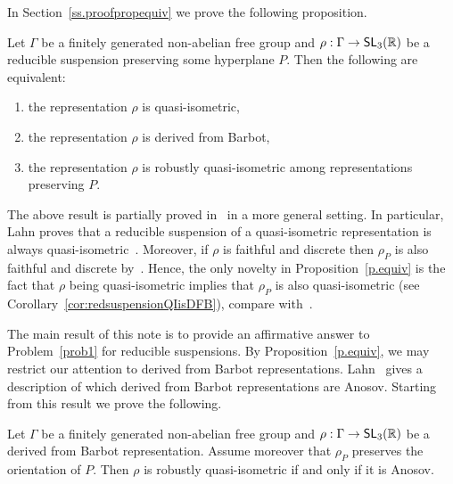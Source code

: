 \documentclass[AHL,Unicode,longabstracts]{cedram}
\DeclareMathOperator{\SL}{\mathsf{SL}}
\newcommand{\R}{\mathbb{R}}
\renewcommand*{\to}{\mathchoice{\longrightarrow}{\rightarrow}{\rightarrow}{\rightarrow}}
\begin{document}
In Section~\ref{ss.proofpropequiv} we prove the following proposition.


\begin{prop}\label{p.equiv}
Let $\Gamma$ be a finitely generated non-abelian free group and $\rho:\Gamma \to \SL_3(\R)$ be a reducible suspension preserving some hyperplane $P$. Then the following are equivalent:
\begin{enumerate}
\item\label{prop1.6.1} the representation $\rho$ is quasi-isometric,
\item\label{prop1.6.2} the representation $\rho$ is derived from Barbot,
\item\label{prop1.6.3} the representation $\rho$ is robustly quasi-isometric among representations preserving $P$.
\end{enumerate}
\end{prop}



The above result is partially proved in~\cite{lahn} in a more general setting. In particular, Lahn proves that a reducible suspension of a quasi-isometric representation is always quasi-isometric~\cite[Proposition~3.4]{lahn}. Moreover, if $\rho$ is faithful and discrete then $\rho_P$ is also faithful and discrete by~\cite[Proposition~3.1]{lahn}. Hence, the only novelty in Proposition~\ref{p.equiv} is the fact that $\rho$ being quasi-isometric implies that $\rho_P$ is also quasi-isometric (see Corollary~\ref{cor:redsuspensionQIisDFB}), compare with~\cite[Proposition~4.2]{lahn}.



The main result of this note is to provide an affirmative answer to Problem~\ref{prob1} for reducible suspensions. By Proposition~\ref{p.equiv}, we may restrict our attention to derived from Barbot representations. Lahn~\cite[Theorem~2]{lahn} gives a description of which derived from Barbot representations are Anosov. Starting from this result we prove the following.


\begin{theo}\label{t.main}

Let $\Gamma$ be a finitely generated non-abelian free group and $\rho:\Gamma \to \SL_3(\R)$ be a derived from Barbot representation. Assume moreover that $\rho_P$ preserves the orientation of $P$. Then $\rho$ is robustly quasi-isometric if and only if it is Anosov.
\end{theo}
\end{document}
